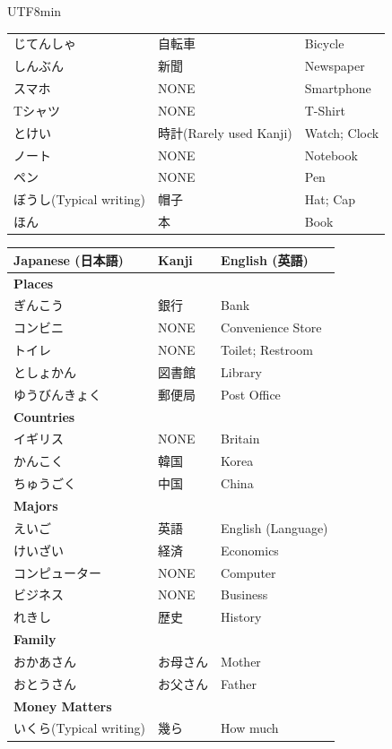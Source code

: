 \documentclass[11pt]{article}
\begin{document}
\begin{CJK}{UTF8}{min}
\begin{tabularx}{\linewidth}{X | X | X}
    じてんしゃ & 自転車 & Bicycle \\
    しんぶん & 新聞 & Newspaper \\
    スマホ & NONE & Smartphone \\
    Tシャツ & NONE & T-Shirt \\
    とけい & 時計(Rarely used Kanji) & Watch; Clock \\
    ノート & NONE & Notebook \\
    ペン & NONE & Pen \\
    ぼうし(Typical writing) & 帽子 & Hat; Cap \\
    ほん & 本 & Book \\
    \bottomrule
\end{tabularx}
\newpage
\begin{tabularx}{\textwidth}{X | X | X}
    \toprule
    \textbf{Japanese (日本語)} & \textbf{Kanji} & \textbf{English (英語)} \\
    \midrule
    \textbf{Places} &  & \\
    ぎんこう & 銀行 & Bank \\
    コンビニ & NONE & Convenience Store \\
    トイレ & NONE & Toilet; Restroom \\
    としょかん & 図書館 & Library \\
    ゆうびんきょく & 郵便局 & Post Office \\
    \hline
    \textbf{Countries} &  & \\
    イギリス & NONE & Britain \\
    かんこく & 韓国 & Korea \\
    ちゅうごく & 中国 & China \\
    \hline
    \textbf{Majors} &  & \\
    えいご & 英語 & English (Language) \\
    けいざい & 経済 & Economics \\
    コンピューター & NONE & Computer \\
    ビジネス & NONE & Business \\
    れきし & 歴史 & History \\
    \hline
    \textbf{Family} &  & \\
    おかあさん & お母さん & Mother \\
    おとうさん & お父さん & Father \\
    \hline
    \textbf{Money Matters} &  & \\
    いくら(Typical writing) & 幾ら & How much \\

\end{tabularx}
\end{CJK}
\end{document}

